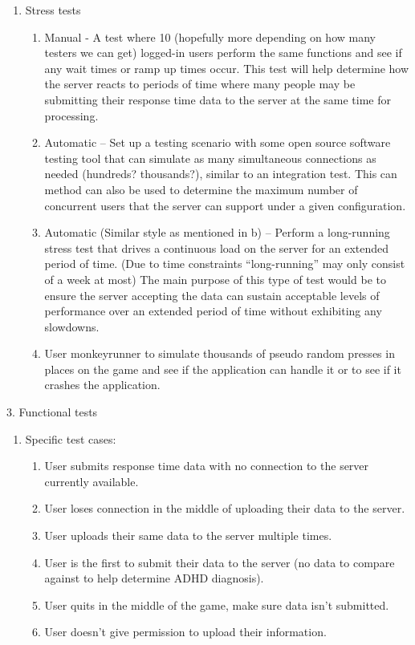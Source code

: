 \documentclass[a4wide]{article}
\begin{document}
\begin{enumerate}
\begin{enumerate}
\item	Stress tests
\begin{enumerate}
\item	Manual - A test where 10 (hopefully more depending on how many testers we can get) logged-in users perform the same functions and see if any wait times or ramp up times occur. This test will help determine how the server reacts to periods of time where many people may be submitting their response time data to the server at the same time for processing.
\item	Automatic – Set up a testing scenario with some open source software testing tool that can simulate as many simultaneous connections as needed (hundreds? thousands?), similar to an integration test. This can method can also be used to determine the maximum number of concurrent users that the server can support under a given configuration.
\item	Automatic (Similar style as mentioned in b) – Perform a long-running stress test that drives a continuous load on the server for an extended period of time.  (Due to time constraints “long-running” may only consist of a week at most) The main purpose of this type of test would be to ensure the server accepting the data can sustain acceptable levels of performance over an extended period of time without exhibiting any slowdowns.
\item	User monkeyrunner to simulate thousands of pseudo random presses in places on the game and see if the application can handle it or to see if it crashes the application.
\end{enumerate}
\end{enumerate}
3.	Functional tests
\begin{enumerate}
\item	Specific test cases:
\begin{enumerate}
\item	User submits response time data with no connection to the server currently available.
\item	User loses connection in the middle of uploading their data to the server.
\item	User uploads their same data to the server multiple times.
\item	User is the first to submit their data to the server (no data to compare against to help determine ADHD diagnosis).
\item	User quits in the middle of the game, make sure data isn’t submitted.
\item	User doesn’t give permission to upload their information.

\end{enumerate}
\end{enumerate}
\end{enumerate}
\end{document}

